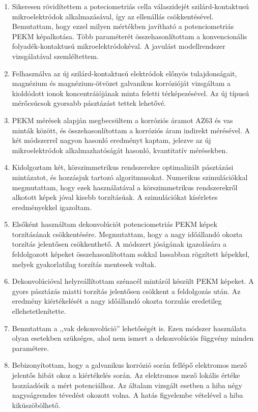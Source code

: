 \begin{enumerate}
\item Sikeresen rövidítettem a poteciometriás cella válaszidejét szilárd-kontaktusú mikroelektródok alkalmazásával, így az ellenállás csökkentésével.
Bemutattam, hogy ezzel milyen mértékben javítható a potenciometriás PEKM képalkotása.
Több paraméterét összehasonlítottam a konvencionális folyadék-kontaktusú mikroelektródokéval.
A javulást modellrendszer vizsgálatával szemléltettem.

\item Felhasználva az új szilárd-kontaktusú elektródok előnyös tulajdonságait, magnézium és magnézium-ötvözet galvanikus korrózióját vizsgáltam a kioldódott ionok koncentráiójának minta feletti térképezésével.
Az új típusú mérőcsúcsok gyorsabb pásztázást tettek lehetővé.

\item PEKM mérések alapján megbecsültem a korróziós áramot AZ63 és vas minták között, és összehasonlítottam a korróziós áram indirekt mérésével.
A két módszerrel nagyon hasonló eredményt kaptam, jelezve az új mikroelektródok alkalmazhatóságát hasonló, kvantitatív mérésekben.

\item Kidolgoztam két, körszimmetrikus rendszerekre optimalizált pásztázási mintázatot, és hozzásjuk tartozó algoritmusokat.
Numerikus szimulációkkal megmutattam, hogy ezek használatával a körszimmetrikus rendszerekről alkotott képek jóval kisebb torzításúak.
A szimulációkat kísérletes eredményekkel igazoltam.

\item Elsőként használtam dekonvolúciót potenciometriás PEKM képek torzításának csökkentésére.
Megmutattam, hogy a nagy időállandó okozta torzítás jelentősen csökkenthető.
A módszert jóságának igazolására a feldolgozott képeket összehasonlítottam sokkal lassabban rögzített képekkel, melyek gyakorlatilag torzítás mentesek voltak.

\item Dekonvolúcióval helyreállítottam szénacél mintáról készült PEKM képeket.
A gyors pásztázás miatti torzítás jelentősen csökkent a feldolgozás után.
Az eredmény kiértékelését a nagy időállandó okozta torzulás eredetileg ellehetetlenítette.

\item Bemutattam a ,,vak dekonvolúció'' lehetőségét is.
Ezen módszer használata olyan esetekben szükséges, ahol nem ismert a dekonvolúciós függvény minden paramétere.

\item Bebizonyítottam, hogy a galvanikus korrózió során fellépő elektromos mező jelentős hibát okoz a kiértékelés során.
Az elektromos mező lokális értéke hozzáadósik a mért potenciálhoz.
Az általam vizsgált esetben a hiba négy nagyságrendes tévedést okozott volna.
A hatás figyelembe vételével a hiba kiküszöbölhető.
\end{enumerate}
